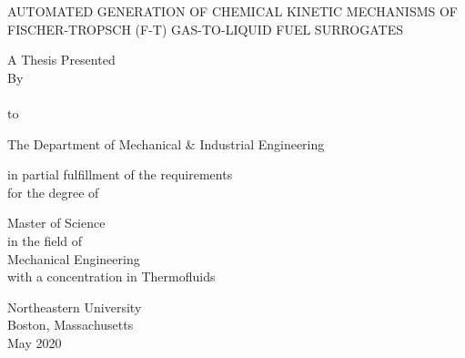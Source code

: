 \begin{titlepage}
   \begin{center}
       \Large{AUTOMATED GENERATION OF CHEMICAL KINETIC MECHANISMS OF FISCHER-TROPSCH (F-T) 
       GAS-TO-LIQUID FUEL SURROGATES}
       \vspace{1.5cm}
       \large
\vspace{2cm}

       A Thesis Presented\\
            \vspace{0.5cm}
                By\\
                \vspace{0.5cm}
        \\
        \vspace{0.5cm}
                    to\\
                    \vspace{0.5cm}
                    
     
\centering The Department of Mechanical \& Industrial Engineering 
\vspace{0.5cm}
       
\centering            in partial fulfillment of the requirements\\ 
            \vspace{0.15cm}
                    for the degree of\\
                    \vspace{0.5cm}
                    
                    \Large{Master of Science}\\
                    \vspace{0.5cm}
                        in the field of\\
                        \vspace{0.5cm}
                        Mechanical Engineering\\ 
                    with a concentration in Thermofluids
 
       \vspace{0.8cm}
 
 
       \LARGE
       Northeastern University\\
       Boston, Massachusetts\\
       \vspace{0.5cm}
       \large{May 2020}
       \vspace{1.25in}
 
   \end{center}
\end{titlepage}